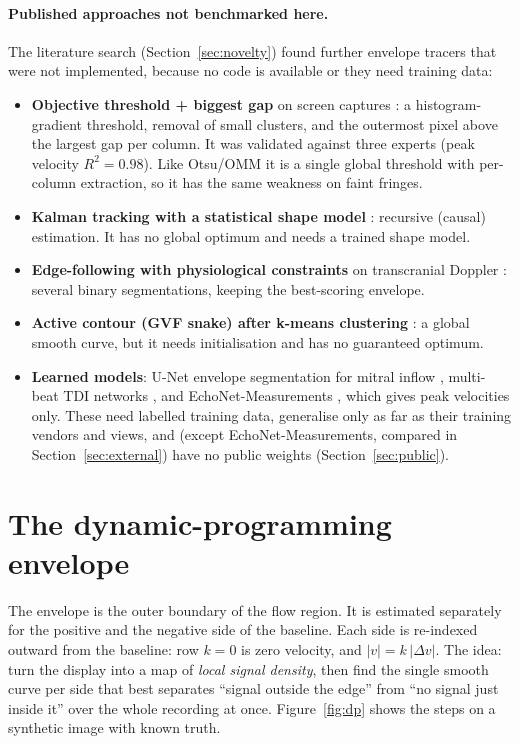 \documentclass[10pt,a4paper]{article}
\begin{document}
\paragraph{Published approaches not benchmarked here.} The literature search (Section~\ref{sec:novelty}) found further envelope tracers
that were not implemented, because no code is available or they need training data:
\begin{itemize}
\item \textbf{Objective threshold + biggest gap} on screen captures \cite{zolgharni}: a histogram-gradient threshold, removal of small clusters,
and the outermost pixel above the largest gap per column. It was validated against three experts (peak velocity $R^2=0.98$). Like Otsu/OMM it is
a single global threshold with per-column extraction, so it has the same weakness on faint fringes.
\item \textbf{Kalman tracking with a statistical shape model} \cite{wang2008}: recursive (causal) estimation. It has no global optimum and needs a trained shape model.
\item \textbf{Edge-following with physiological constraints} on transcranial Doppler \cite{tcd2020}: several binary segmentations, keeping the best-scoring envelope.
\item \textbf{Active contour (GVF snake) after k-means clustering} \cite{zamzmi}: a global smooth curve, but it needs initialisation and has no
guaranteed optimum.
\item \textbf{Learned models}: U-Net envelope segmentation for mitral inflow \cite{mitralunet}, multi-beat TDI networks \cite{lane2023}, and
EchoNet-Measurements \cite{echonetmeas}, which gives peak velocities only. These need labelled training data, generalise only as far as their
training vendors and views, and (except EchoNet-Measurements, compared in Section~\ref{sec:external}) have no public weights
(Section~\ref{sec:public}).
\end{itemize}

\section{The dynamic-programming envelope}
\label{sec:dp}
The envelope is the outer boundary of the flow region. It is estimated separately for the positive and the negative
side of the baseline. Each side is re-indexed outward from the baseline: row $k=0$ is zero velocity, and $|v| = k\,|\Delta v|$.
The idea: turn the display into a map of \emph{local signal density}, then find the single smooth curve per side
that best separates ``signal outside the edge'' from ``no signal just inside it'' over the whole recording at once.
Figure~\ref{fig:dp} shows the steps on a synthetic image with known truth.
\end{document}

